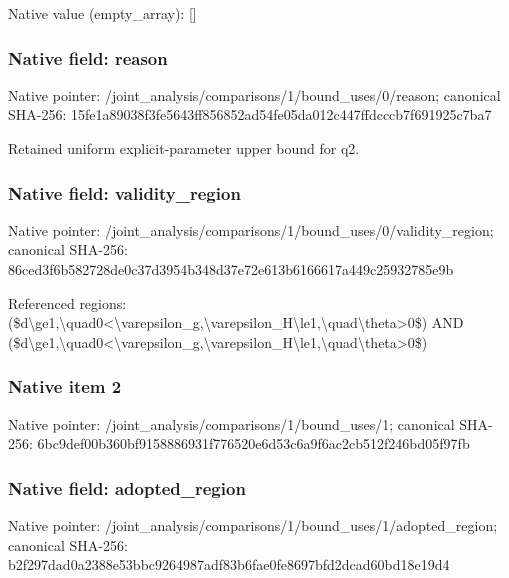 \documentclass[10pt,a4paper]{article}
\begin{document}
Native value (empty\_\allowbreak{}array): []

\subsubsection{Native field: reason}
Native pointer: /joint\_\allowbreak{}analysis/comparisons/1/bound\_\allowbreak{}uses/0/reason; canonical SHA-256: 15fe1a89038f3fe5643ff856852ad54fe05da012c447ffdcccb7f691925c7ba7

\begingroup\raggedright\sloppy Retained uniform explicit-parameter upper bound for q2.\par\endgroup

\subsubsection{Native field: validity\_\allowbreak{}region}
Native pointer: /joint\_\allowbreak{}analysis/comparisons/1/bound\_\allowbreak{}uses/0/validity\_\allowbreak{}region; canonical SHA-256: 86ced3f6b582728de0c37d3954b348d37e72e613b6166617a449c25932785e9b

\begingroup\raggedright\sloppy Referenced regions:\allowbreak{} (\$d\textbackslash{}ge1,\allowbreak{}\textbackslash{}quad0<\textbackslash{}varepsilon\_\allowbreak{}g,\allowbreak{}\textbackslash{}varepsilon\_\allowbreak{}H\textbackslash{}le1,\allowbreak{}\textbackslash{}quad\textbackslash{}theta>0\$) AND (\$d\textbackslash{}ge1,\allowbreak{}\textbackslash{}quad0<\textbackslash{}varepsilon\_\allowbreak{}g,\allowbreak{}\textbackslash{}varepsilon\_\allowbreak{}H\textbackslash{}le1,\allowbreak{}\textbackslash{}quad\textbackslash{}theta>0\$)\par\endgroup

\subsubsection{Native item 2}
Native pointer: /joint\_\allowbreak{}analysis/comparisons/1/bound\_\allowbreak{}uses/1; canonical SHA-256: 6bc9def00b360bf9158886931f776520e6d53c6a9f6ac2cb512f246bd05f97fb

\subsubsection{Native field: adopted\_\allowbreak{}region}
Native pointer: /joint\_\allowbreak{}analysis/comparisons/1/bound\_\allowbreak{}uses/1/adopted\_\allowbreak{}region; canonical SHA-256: b2f297dad0a2388e53bbc9264987adf83b6fae0fe8697bfd2dcad60bd18e19d4
\end{document}
